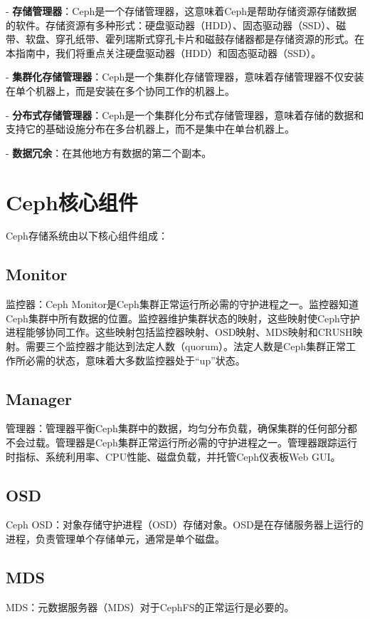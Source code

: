 \documentclass[12pt,UTF8]{ctexbook}
\begin{document}
- \textbf{存储管理器}：Ceph是一个存储管理器，这意味着Ceph是帮助存储资源存储数据的软件。存储资源有多种形式：硬盘驱动器（HDD）、固态驱动器（SSD）、磁带、软盘、穿孔纸带、霍列瑞斯式穿孔卡片和磁鼓存储器都是存储资源的形式。在本指南中，我们将重点关注硬盘驱动器（HDD）和固态驱动器（SSD）。

- \textbf{集群化存储管理器}：Ceph是一个集群化存储管理器，意味着存储管理器不仅安装在单个机器上，而是安装在多个协同工作的机器上。

- \textbf{分布式存储管理器}：Ceph是一个集群化分布式存储管理器，意味着存储的数据和支持它的基础设施分布在多台机器上，而不是集中在单台机器上。

- \textbf{数据冗余}：在其他地方有数据的第二个副本。

\section{Ceph核心组件}

Ceph存储系统由以下核心组件组成：

\subsection{Monitor}
监控器：Ceph Monitor是Ceph集群正常运行所必需的守护进程之一。监控器知道Ceph集群中所有数据的位置。监控器维护集群状态的映射，这些映射使Ceph守护进程能够协同工作。这些映射包括监控器映射、OSD映射、MDS映射和CRUSH映射。需要三个监控器才能达到法定人数（quorum）。法定人数是Ceph集群正常工作所必需的状态，意味着大多数监控器处于“up”状态。

\subsection{Manager}
管理器：管理器平衡Ceph集群中的数据，均匀分布负载，确保集群的任何部分都不会过载。管理器是Ceph集群正常运行所必需的守护进程之一。管理器跟踪运行时指标、系统利用率、CPU性能、磁盘负载，并托管Ceph仪表板Web GUI。

\subsection{OSD}
Ceph OSD：对象存储守护进程（OSD）存储对象。OSD是在存储服务器上运行的进程，负责管理单个存储单元，通常是单个磁盘。

\subsection{MDS}
MDS：元数据服务器（MDS）对于CephFS的正常运行是必要的。
\end{document}
